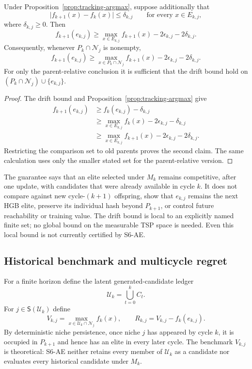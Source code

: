 \begin{proposition}
\label{prop:tracking-drift}
Under Proposition~\ref{prop:tracking-argmax}, suppose additionally that
\[
 \lvert f_{k+1}(x)-f_k(x)\rvert\leq\delta_{k,j}
 \qquad\text{for every }x\in E_{k,j},
\]
where $\delta_{k,j}\geq0$.  Then
\[
 f_{k+1}(e_{k,j})\geq
 \max_{x\in E_{k,j}}f_{k+1}(x)
 -2\epsilon_{k,j}-2\delta_{k,j}.
\]
Consequently, whenever $P_k\cap\mathcal N_j$ is nonempty,
\[
 f_{k+1}(e_{k,j})\geq
 \max_{x\in P_k\cap\mathcal N_j}f_{k+1}(x)
 -2\epsilon_{k,j}-2\delta_{k,j}.
\]
For only the parent-relative conclusion it is sufficient that the drift bound
hold on $(P_k\cap\mathcal N_j)\cup\{e_{k,j}\}$.
\end{proposition}

\begin{proof}
The drift bound and Proposition~\ref{prop:tracking-argmax} give
\begin{align*}
 f_{k+1}(e_{k,j})
 &\geq f_k(e_{k,j})-\delta_{k,j}\\
 &\geq \max_{x\in E_{k,j}}f_k(x)
           -2\epsilon_{k,j}-\delta_{k,j}\\
 &\geq \max_{x\in E_{k,j}}f_{k+1}(x)
           -2\epsilon_{k,j}-2\delta_{k,j}.
\end{align*}
Restricting the comparison set to old parents proves the second claim.  The
same calculation uses only the smaller stated set for the parent-relative
version.
\end{proof}

The guarantee says that an elite selected under $M_k$ remains competitive,
after one update, with candidates that were already available in cycle $k$.
It does not compare against new cycle-$(k+1)$ offspring, show that
$e_{k,j}$ remains the next HGB elite, preserve its individual hash beyond
$P_{k+1}$, or control future reachability or training value.  The drift bound
is local to an explicitly named finite set; no global bound on the measurable
TSP space is needed.  Even this local bound is not currently certified by
S6-AE.

\subsection{Historical benchmark and multicycle regret}
For a finite horizon define the latent generated-candidate ledger
\[
 \mathcal U_k=\bigcup_{t=0}^{k}C_t.
\]
For $j\in\mathsf S(\mathcal U_k)$ define
\[
 V_{k,j}=\max_{x\in\mathcal U_k\cap\mathcal N_j}f_k(x),
 \qquad
 R_{k,j}=V_{k,j}-f_k(e_{k,j}).
\]
By deterministic niche persistence, once niche $j$ has appeared by cycle
$k$, it is occupied in $P_{k+1}$ and hence has an elite in every later cycle.
The benchmark $V_{k,j}$ is theoretical: S6-AE neither retains every member of
$\mathcal U_k$ as a candidate nor evaluates every historical candidate under
$M_k$.

